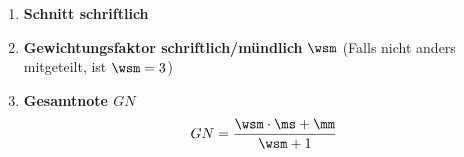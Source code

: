 \begin{enumerate}[label=\textbf{(\arabic*)}, align=left, leftmargin=*]
{\[\begin{cases}
		\mhalf - \left | \wth \right | & \text{für }    \wdis < 1 \text{ und \defsn} \\
		\mhalf + \left | \wth \right | & \text{für }    \wdis < 1 \text{ und \defsnp} \\
	\end{cases}
	\]
	\vspace{-0.2cm}
	\[
	\wvdrei =
	\begin{cases}
		0 & \text{für } \wdis \geq 1\\
		\left | \frac{\wnull}{\wth}  \right | & \text{ansonsten}\\
	\end{cases}
	\,\hspace{0.5cm}\,
	\wvvier =
	\begin{cases}
		0 & \text{für }  \wdis \geq 1 \\
		\frac{\nveins \cdot \wveins + \nvo \cdot \mseins + \nvzwei \cdot \wvzwei}{\nvg} & \text{ansonsten}\\
	\end{cases}
	\]
	}
	\item \textbf{Schnitt schriftlich}
	\item \textbf{Gewichtungsfaktor schriftlich/mündlich} $\wsm$ (Falls nicht anders mitgeteilt, ist $\wsm=3$)
	\item \textbf{Gesamtnote $GN$}
	\vspace*{-0.5cm}
	\[
	GN = \frac{\wsm \cdot \ms + \mm}{\wsm+1}
	\]
\end{enumerate}

\renewcommand\refname{\footnotesize Quellen}
\renewcommand{\bibname}{Quellen}

\vfill


\begingroup
\tiny
\setlength{\bibsep}{0pt}


\endgroup
{}